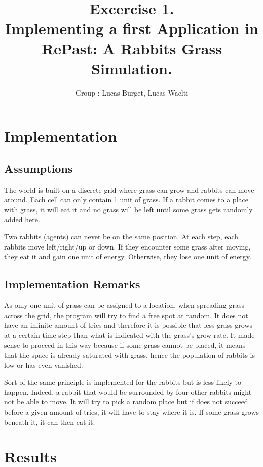\documentclass[11pt]{article}
\title{\bf Excercise 1.\\ Implementing a first Application in RePast: A Rabbits Grass Simulation.}
\author{Group \textnumero 24: Lucas Burget, Lucas Waelti}
\begin{document}
\maketitle

\section{Implementation}

\subsection{Assumptions}
The world is built on a discrete grid where grass can grow and rabbits can move around. Each cell can only contain 1 unit of grass. If a rabbit comes to a place with grass, it will eat it and no grass will be left until some grass gets randomly added here. 

Two rabbits (agents) can never be on the same position. At each step, each rabbits move left/right/up or down. If they encounter some grass after moving, they eat it and gain one unit of energy. Otherwise, they lose one unit of energy. 

\subsection{Implementation Remarks}
As only one unit of grass can be assigned to a location, when spreading grass across the grid, the program will try to find a free spot at random. It does not have an infinite amount of tries and therefore it is possible that less grass grows at a certain time step than what is indicated with the grass's grow rate. It made sense to proceed in this way because if some grass cannot be placed, it means that the space is already saturated with grass, hence the population of rabbits is low or has even vanished. 

Sort of the same principle is implemented for the rabbits but is less likely to happen. Indeed, a rabbit that would be surrounded by four other rabbits might not be able to move. It will try to pick a random place but if does not succeed before a given amount of tries, it will have to stay where it is. If some grass grows beneath it, it can then eat it. 

\section{Results}
\end{document}
